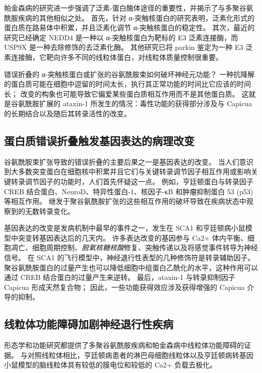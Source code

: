 帕金森病的研究进一步强调了泛素-蛋白酶体途径的重要性，并揭示了与多聚谷氨酰胺疾病的其他相似之处。
首先，针对 α-突触核蛋白的研究表明，泛素化形式的蛋白质在路易体中积累，并且泛素化调节 α-突触核蛋白的稳定性。
其次，最近的研究已经确定 NEDD4 是一种以 α-突触核蛋白为靶标的 E3 泛素连接酶，而 USP9X 是一种去除修饰的去泛素化酶。
其他研究已将 parkin 鉴定为一种 E3 泛素连接酶，它靶向许多不同的线粒体蛋白，对线粒体质量控制很重要。


错误折叠的 α-突触核蛋白或扩张的谷氨酰胺束如何破坏神经元功能？
一种抗降解的蛋白质可能在细胞中逗留的时间太长，执行其正常功能的时间比它应该的时间长；
改变的构象也可能导致它偏爱某些蛋白质相互作用而不是其他蛋白质。
这就是谷氨酰胺扩展的 ataxin-1 所发生的情况：毒性功能的获得部分涉及与 Capicua 的长期结合以及随后其转录活性的改变。



\subsection{蛋白质错误折叠触发基因表达的病理改变}

谷氨酰胺束扩张导致的错误折叠的主要后果之一是基因表达的改变。
当人们意识到大多数突变蛋白在细胞核中积累并且它们与关键转录调节因子相互作用或影响关键转录调节因子的功能时，人们首先怀疑这一点。
例如，亨廷顿蛋白与转录因子 CREB 结合蛋白、NeuroD、特异性蛋白-1、核因子-κB 和肿瘤抑制蛋白 53 (p53) 等相互作用。
继发于聚谷氨酰胺扩张的这些相互作用的破坏导致在疾病状态中观察到的无数转录变化。


基因表达的改变是发病机制中最早的事件之一，发生在 SCA1 和亨廷顿病小鼠模型中突变转基因表达后的几天内。
许多表达改变的基因参与 Ca2+ 体内平衡、细胞凋亡、细胞周期控制、\textit{脱氧核糖核酸}修复、突触传递以及将感觉事件转导为神经信号。
在 SCA1 的飞行模型中，神经退行性表型的几种修饰符是转录辅助因子。
聚谷氨酰胺蛋白的过量产生也可以降低细胞中组蛋白乙酰化的水平，这种作用可以通过 CREB 结合蛋白的过量产生来逆转。
最后，ataxin-1 与转录抑制因子 Capicua 形成天然复合物；
因此，一些功能获得效应涉及获得增强的 Capicua 介导的抑制。



\subsection{线粒体功能障碍加剧神经退行性疾病}

形态学和功能研究都提供了多聚谷氨酰胺疾病和帕金森病中线粒体功能障碍的证据。
与对照线粒体相比，亨廷顿病患者的淋巴母细胞线粒体以及亨廷顿病转基因小鼠模型的脑线粒体具有较低的膜电位和较低的 Ca2+ 负载去极化。


